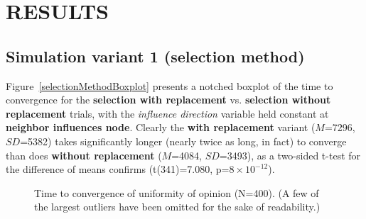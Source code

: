 
\section{RESULTS}

\subsection{Simulation variant 1 (selection method)}

Figure~\ref{selectionMethodBoxplot} presents a notched boxplot of the time to
convergence for the \textbf{selection with replacement} vs. \textbf{selection
without replacement} trials, with the \textsl{influence direction} variable
held constant at \textbf{neighbor influences node}. Clearly the \textbf{with
replacement} variant ($M$=7296, $SD$=5382) takes significantly longer (nearly
twice as long, in fact) to converge than does \textbf{without replacement}
($M$=4084, $SD$=3493), as a two-sided t-test for the difference of means
confirms (t(341)=7.080, p=$8\times 10^{-12}$).

\begin{figure}[ht]
  \centering
  \hfill
  \caption{Time to convergence of uniformity of opinion (N=400). (A few of the
largest outliers have been omitted for the sake of readability.)}
\end{figure}


